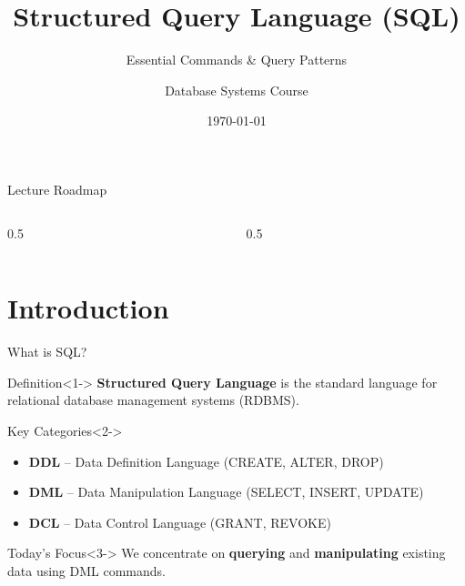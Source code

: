 \documentclass[aspectratio=169,11pt]{beamer}
\title{Structured Query Language (SQL)}
\subtitle{Essential Commands \& Query Patterns}
\author{Database Systems Course}
\institute{CS Department}
\date{\today}
\begin{document}
\begin{frame}
\titlepage
\end{frame}

\begin{frame}{Lecture Roadmap}
\begin{columns}[T]
\begin{column}{0.5\textwidth}
\tableofcontents[sections={1-3}]
\end{column}
\pause
\begin{column}{0.5\textwidth}
\tableofcontents[sections={4-6}]
\end{column}
\end{columns}
\end{frame}

\section{Introduction}
\begin{frame}{What is SQL?}
\begin{block}{Definition}<1->
\textbf{Structured Query Language} is the standard language for relational database management systems (RDBMS).
\end{block}

\pause
\begin{exampleblock}{Key Categories}<2->
\begin{itemize}
    \item \textbf{DDL} -- Data Definition Language (CREATE, ALTER, DROP)
    \item \textbf{DML} -- Data Manipulation Language (SELECT, INSERT, UPDATE)
    \item \textbf{DCL} -- Data Control Language (GRANT, REVOKE)
\end{itemize}
\end{exampleblock}

\pause
\begin{alertblock}{Today's Focus}<3->
We concentrate on \textbf{querying} and \textbf{manipulating} existing data using DML commands.
\end{alertblock}
\end{frame}
\end{document}
